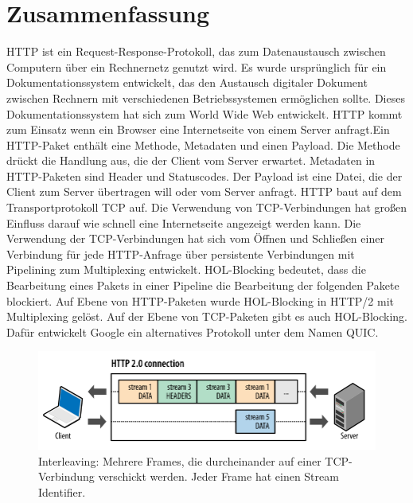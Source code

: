 \documentclass{llncs}
\begin{document}
\section{Zusammenfassung}
HTTP ist ein Request-Response-Protokoll, das zum Datenaustausch zwischen Computern über ein Rechnernetz genutzt wird. Es wurde ursprünglich für ein Dokumentationssystem entwickelt, das den Austausch digitaler Dokument zwischen Rechnern mit verschiedenen Betriebssystemen ermöglichen sollte. Dieses Dokumentationssystem hat sich zum World Wide Web entwickelt. 
HTTP kommt zum Einsatz wenn ein Browser eine Internetseite von einem Server anfragt.\newline Ein HTTP-Paket enthält eine Methode, Metadaten und einen Payload. Die Methode drückt die Handlung aus, die der Client vom Server erwartet. Metadaten in HTTP-Paketen sind Header und Statuscodes. Der Payload ist eine Datei, die der Client zum Server übertragen will oder vom Server anfragt. \newline
HTTP baut auf dem Transportprotokoll TCP auf.
Die Verwendung von TCP-Verbindungen hat großen Einfluss darauf wie schnell eine Internetseite angezeigt werden kann. Die Verwendung der TCP-Verbindungen hat sich vom Öffnen und Schließen einer Verbindung für jede HTTP-Anfrage über persistente Verbindungen mit Pipelining zum Multiplexing entwickelt. \newline
HOL-Blocking bedeutet, dass die Bearbeitung eines Pakets in einer Pipeline die Bearbeitung der folgenden Pakete blockiert. Auf Ebene von HTTP-Paketen wurde HOL-Blocking in HTTP/2 mit Multiplexing gelöst.
 Auf der Ebene von TCP-Paketen gibt es auch HOL-Blocking. Dafür entwickelt Google ein alternatives Protokoll unter dem Namen QUIC.
 \begin{figure}[!ht]
\includegraphics[width=\columnwidth]{Multiplexing.png}
\caption{Interleaving: Mehrere Frames, die durcheinander auf einer TCP-Verbindung verschickt werden. Jeder Frame hat einen Stream Identifier. 
\cite{Interleaving}
}
\end{figure}




\end{document}
